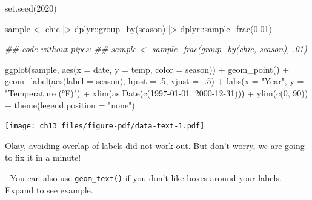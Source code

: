 \documentclass[
  letterpaper,
  DIV=11,
  numbers=noendperiod]{scrreprt}
\newenvironment{Shaded}{\begin{snugshade}}{\end{snugshade}}
\newcommand{\AttributeTok}[1]{\textcolor[rgb]{0.40,0.45,0.13}{#1}}
\newcommand{\DecValTok}[1]{\textcolor[rgb]{0.68,0.00,0.00}{#1}}
\newcommand{\DocumentationTok}[1]{\textcolor[rgb]{0.37,0.37,0.37}{\textit{#1}}}
\newcommand{\FloatTok}[1]{\textcolor[rgb]{0.68,0.00,0.00}{#1}}
\newcommand{\FunctionTok}[1]{\textcolor[rgb]{0.28,0.35,0.67}{#1}}
\newcommand{\NormalTok}[1]{\textcolor[rgb]{0.00,0.23,0.31}{#1}}
\newcommand{\OtherTok}[1]{\textcolor[rgb]{0.00,0.23,0.31}{#1}}
\newcommand{\SpecialCharTok}[1]{\textcolor[rgb]{0.37,0.37,0.37}{#1}}
\newcommand{\StringTok}[1]{\textcolor[rgb]{0.13,0.47,0.30}{#1}}
\begin{document}
\begin{Shaded}
\begin{Highlighting}[]
\FunctionTok{set.seed}\NormalTok{(}\DecValTok{2020}\NormalTok{)}

\NormalTok{sample }\OtherTok{\textless{}{-}}\NormalTok{ chic }\SpecialCharTok{|\textgreater{}}
\NormalTok{  dplyr}\SpecialCharTok{::}\FunctionTok{group\_by}\NormalTok{(season) }\SpecialCharTok{|\textgreater{}}
\NormalTok{  dplyr}\SpecialCharTok{::}\FunctionTok{sample\_frac}\NormalTok{(}\FloatTok{0.01}\NormalTok{)}

\DocumentationTok{\#\# code without pipes:}
\DocumentationTok{\#\# sample \textless{}{-} sample\_frac(group\_by(chic, season), .01)}

\FunctionTok{ggplot}\NormalTok{(sample, }\FunctionTok{aes}\NormalTok{(}\AttributeTok{x =}\NormalTok{ date, }\AttributeTok{y =}\NormalTok{ temp, }\AttributeTok{color =}\NormalTok{ season)) }\SpecialCharTok{+}
  \FunctionTok{geom\_point}\NormalTok{() }\SpecialCharTok{+}
  \FunctionTok{geom\_label}\NormalTok{(}\FunctionTok{aes}\NormalTok{(}\AttributeTok{label =}\NormalTok{ season), }\AttributeTok{hjust =}\NormalTok{ .}\DecValTok{5}\NormalTok{, }\AttributeTok{vjust =} \SpecialCharTok{{-}}\NormalTok{.}\DecValTok{5}\NormalTok{) }\SpecialCharTok{+}
  \FunctionTok{labs}\NormalTok{(}\AttributeTok{x =} \StringTok{"Year"}\NormalTok{, }\AttributeTok{y =} \StringTok{"Temperature (°F)"}\NormalTok{) }\SpecialCharTok{+}
  \FunctionTok{xlim}\NormalTok{(}\FunctionTok{as.Date}\NormalTok{(}\FunctionTok{c}\NormalTok{(}\StringTok{\textquotesingle{}1997{-}01{-}01\textquotesingle{}}\NormalTok{, }\StringTok{\textquotesingle{}2000{-}12{-}31\textquotesingle{}}\NormalTok{))) }\SpecialCharTok{+}
  \FunctionTok{ylim}\NormalTok{(}\FunctionTok{c}\NormalTok{(}\DecValTok{0}\NormalTok{, }\DecValTok{90}\NormalTok{)) }\SpecialCharTok{+}
  \FunctionTok{theme}\NormalTok{(}\AttributeTok{legend.position =} \StringTok{"none"}\NormalTok{)}
\end{Highlighting}
\end{Shaded}

\texttt{[image: ch13\_files/figure-pdf/data-text-1.pdf]}

Okay, avoiding overlap of labels did not work out. But don't worry, we
are going to fix it in a minute!

💁 You can also use \texttt{geom\_text()} if you don't like boxes around
your labels. Expand to see example.
\end{document}

